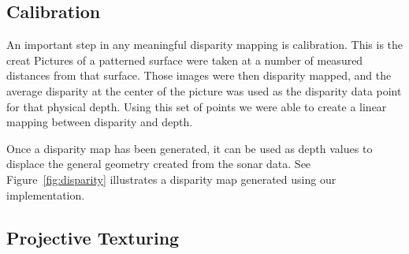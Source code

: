 \documentclass[a4paper,twoside]{article}
\begin{document}




\subsection{Calibration}
\label{subsec:calibration}

An important step in any meaningful disparity mapping is calibration.
This is the creat
Pictures of a patterned surface were taken at a number of measured distances from that surface.
Those images were then disparity mapped, and the average disparity at the center of the picture was used as the disparity data point for that physical depth.
Using this set of points we were able to create a linear mapping between disparity and depth.


Once a disparity map has been generated, it can be used as depth values to displace the general geometry created from the sonar data. See Figure~\ref{fig:disparity} illustrates a disparity map generated using our implementation.


\subsection{Projective Texturing}
\label{subsec:projectiveTexturing}
\end{document}
